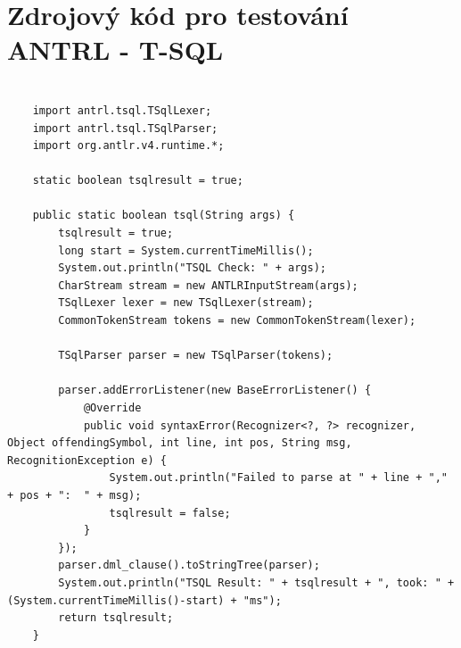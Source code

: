 \documentclass[czech,bachelor,public,dept460,male,cpdeclaration,twoside]{diploma}
\begin{document}
\section{Zdrojový kód pro testování ANTRL - T-SQL}
\begin{lstlisting}[caption=ANTRL T-SQL]

	import antrl.tsql.TSqlLexer;
	import antrl.tsql.TSqlParser;
	import org.antlr.v4.runtime.*;

  	static boolean tsqlresult = true;

    public static boolean tsql(String args) {
        tsqlresult = true;
        long start = System.currentTimeMillis();
        System.out.println("TSQL Check: " + args);
        CharStream stream = new ANTLRInputStream(args);
        TSqlLexer lexer = new TSqlLexer(stream);
        CommonTokenStream tokens = new CommonTokenStream(lexer);
        
        TSqlParser parser = new TSqlParser(tokens);

        parser.addErrorListener(new BaseErrorListener() {
            @Override
            public void syntaxError(Recognizer<?, ?> recognizer, Object offendingSymbol, int line, int pos, String msg, RecognitionException e) {
                System.out.println("Failed to parse at " + line + "," + pos + ":  " + msg);
                tsqlresult = false;
            }
        });
        parser.dml_clause().toStringTree(parser);
        System.out.println("TSQL Result: " + tsqlresult + ", took: " + (System.currentTimeMillis()-start) + "ms");
        return tsqlresult;
    }
\end{lstlisting}
\end{document}
